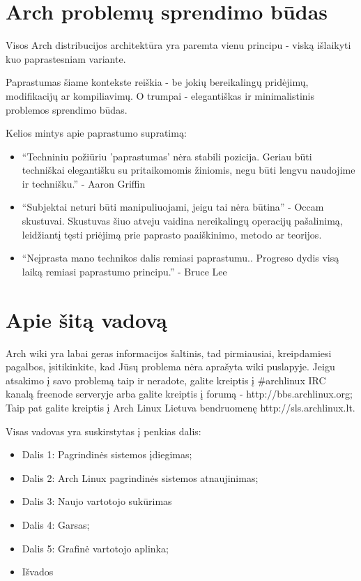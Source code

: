   \section{Arch problemų sprendimo būdas}
  
  Visos Arch distribucijos architektūra yra paremta vienu principu -
  viską išlaikyti kuo paprastesniam variante.

  Paprastumas šiame kontekste reiškia - be jokių bereikalingų
  pridėjimų, modifikacijų ar kompiliavimų. O trumpai - elegantiškas
  ir minimalistinis problemos sprendimo būdas.

  Kelios mintys apie paprastumo supratimą:
  \begin{itemize}
    \item ``Techniniu požiūriu 'paprastumas' nėra stabili
      pozicija. Geriau būti techniškai elegantišku su pritaikomomis
      žiniomis, negu būti lengvu naudojime ir technišku.'' - Aaron
      Griffin
    \item ``Subjektai neturi būti manipuliuojami, jeigu tai nėra
      būtina'' - Occam skustuvai. Skustuvas šiuo atveju vaidina
      nereikalingų operacijų pašalinimą, leidžiantį tęsti priėjimą prie
      paprasto paaiškinimo, metodo ar teorijos.
    \item ``Neįprasta mano technikos dalis remiasi
      paprastumu.. Progreso dydis visą laiką remiasi paprastumo principu.'' - Bruce Lee
  \end{itemize}

  \section{Apie šitą vadovą}

    Arch wiki yra labai geras informacijos šaltinis, tad pirmiausiai,
    kreipdamiesi pagalbos, įsitikinkite, kad Jūsų problema nėra
    aprašyta wiki puslapyje. Jeigu atsakimo į savo problemą taip ir neradote, galite
    kreiptis į $\#$archlinux IRC kanalą freenode serveryje arba galite
    kreiptis į forumą - http://bbs.archlinux.org; Taip pat galite
    kreiptis į Arch Linux Lietuva bendruomenę http://sls.archlinux.lt.

    Visas vadovas yra suskirstytas į penkias dalis:
    \begin{itemize}
      \item Dalis 1: Pagrindinės sistemos įdiegimas;
      \item Dalis 2: Arch Linux pagrindinės sistemos atnaujinimas;
      \item Dalis 3: Naujo vartotojo sukūrimas
      \item Dalis 4: Garsas;
      \item Dalis 5: Grafinė vartotojo aplinka;
      \item Išvados
    \end{itemize}
